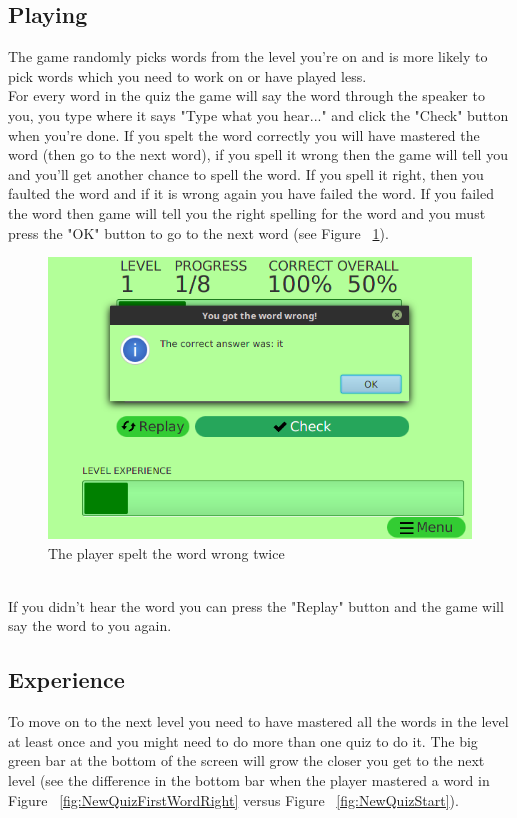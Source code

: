 \documentclass[12pt,a4paper,titlepage,onecolumn]{article}
\begin{document}
	\subsection{Playing}
	The game randomly picks words from the level you're on and is more likely to pick words which you need to work on or have played less.\\
	For every word in the quiz the game will say the word through the speaker to you, you type where it says "Type what you hear..." and click the "Check" button when you're done. If you spelt the word correctly you will have mastered the word (then go to the next word), if you spell it wrong then the game will tell you and you'll get another chance to spell the word. If you spell it right, then you faulted the word and if it is wrong again you have failed the word. If you failed the word then game will tell you the right spelling for the word and you must press the "OK" button to go to the next word (see Figure ~\ref{fig:NewQuizSecondWordWrong}).
	\begin{figure}[h]
		\centering
		\includegraphics[width=1\linewidth]{Figures/NewQuiz/NewQuizSecondWordWrong}
		\caption[Failed Word]{The player spelt the word wrong twice}
		\label{fig:NewQuizSecondWordWrong}
	\end{figure}\\
	If you didn't hear the word you can press the "Replay" button and the game will say the word to you again.
	\subsection{Experience}
	To move on to the next level you need to have mastered all the words in the level at least once and you might need to do more than one quiz to do it. The big green bar at the bottom of the screen will grow the closer you get to the next level (see the difference in the bottom bar when the player mastered a word in Figure ~\ref{fig:NewQuizFirstWordRight} versus Figure ~\ref{fig:NewQuizStart}).
\end{document}
